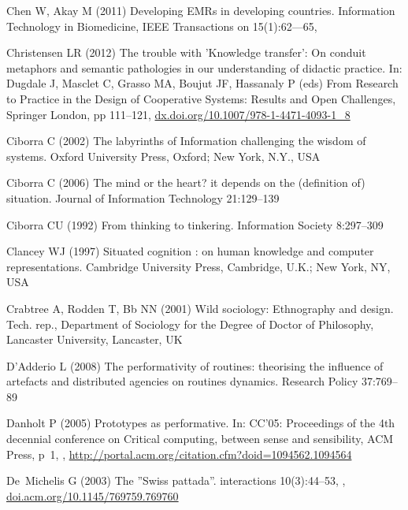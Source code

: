 \documentclass{article}
\begin{document}
\begin{thebibliography}{193}
Chen W, Akay M (2011) Developing {EMRs} in developing countries. Information
  Technology in Biomedicine, {IEEE} Transactions on 15(1):62---65,

Christensen LR (2012) The trouble with {'Knowledge} transfer': On conduit
  metaphors and semantic pathologies in our understanding of didactic practice.
  In: Dugdale J, Masclet C, Grasso MA, Boujut JF, Hassanaly P (eds) From
  Research to Practice in the Design of Cooperative Systems: Results and Open
  Challenges, Springer London, pp 111--121,
  \urlprefix\url{dx.doi.org/10.1007/978-1-4471-4093-1_8}

Ciborra C (2002) The labyrinths of Information challenging the wisdom of
  systems. Oxford University Press, Oxford; New York, {N.Y.}, {USA}

Ciborra C (2006) The mind or the heart? it depends on the (definition of)
  situation. Journal of Information Technology 21:129--139

Ciborra CU (1992) From thinking to tinkering. Information Society 8:297--309

Clancey WJ (1997) Situated cognition : on human knowledge and computer
  representations. Cambridge University Press, Cambridge, {U.K.;} New York,
  {NY}, {USA}

Crabtree A, Rodden T, Bb NN (2001) Wild sociology: Ethnography and design.
  Tech. rep., Department of Sociology for the Degree of Doctor of Philosophy,
  Lancaster University, Lancaster, {UK}

{D'Adderio} L (2008) The performativity of routines: theorising the influence
  of artefacts and distributed agencies on routines dynamics. Research Policy
  37:769--89

Danholt P (2005) Prototypes as performative. In: {CC'05:} Proceedings of the
  4th decennial conference on Critical computing, between sense and
  sensibility, {ACM} Press, p~1, ,
  \urlprefix\url{http://portal.acm.org/citation.cfm?doid=1094562.1094564}

De~Michelis G (2003) The {''Swiss} pattada''. interactions 10(3):44--53,
  ,
  \urlprefix\url{doi.acm.org/10.1145/769759.769760}


\end{thebibliography}
\end{document}
